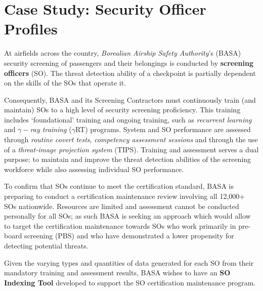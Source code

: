 \section{Case Study: Security Officer Profiles}
At airfields across the country, \textit{Borealian Airship Safety Authority}'s (BASA) security screening of passengers and their belongings is conducted
by \textbf{screening officers} (SO). The threat detection ability of a checkpoint is partially dependent on the skills of the SOs that operate it.
\par Consequently, BASA and its Screening Contractors must continuously train (and maintain) SOs to a
high level of security screening proficiency. This training includes `foundational' training and ongoing
training, such as \textit{recurrent learning} and $\gamma-$\textit{ray training} ($\gamma$RT) programs. System and SO performance are assessed through \textit{routine covert tests}, \textit{competency assessment sessions} and through the use of a \textit{threat-image projection system} (TIPS). Training and assessment serves a dual purpose: to maintain and improve the threat detection abilities of the screening workforce while also assessing individual SO performance.
\par To confirm that SOs continue to meet the certification standard, BASA is preparing to conduct
a certification maintenance review involving all 12,000+ SOs nationwide. Resources are limited and
assessment cannot be conducted personally for all SOs; as such BASA is seeking an approach which
would allow to target the certification maintenance towards SOs who work primarily in pre-board
screening (PBS) and who have demonstrated a lower propensity for detecting potential threats.
\par Given the varying types and quantities of data generated for each SO from their mandatory training
and assessment results, BASA wishes to have an \textbf{SO Indexing Tool} developed to support the SO
certification maintenance program.
